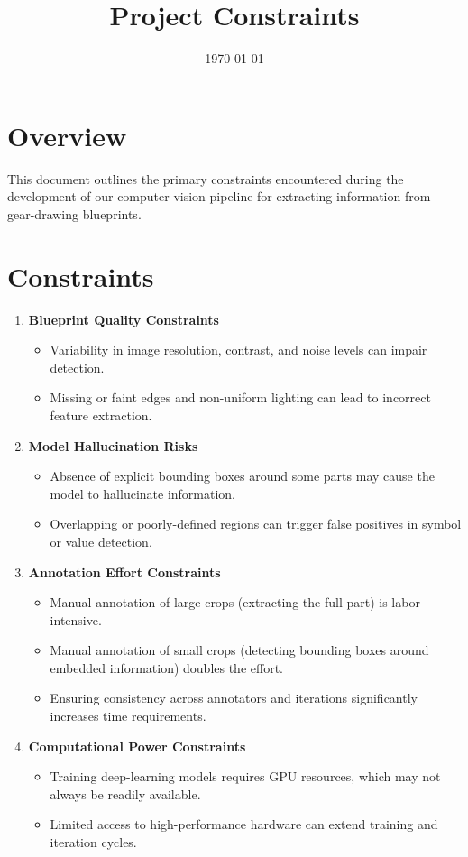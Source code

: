 \documentclass[a4paper,12pt]{article}
\title{Project Constraints}
\date{\today}
\begin{document}
\maketitle

\section*{Overview}
This document outlines the primary constraints encountered during the development
of our computer vision pipeline for extracting information from gear-drawing blueprints.

\section*{Constraints}
\begin{enumerate}[left=0pt]
\item \textbf{Blueprint Quality Constraints}
\begin{itemize}
\item Variability in image resolution, contrast, and noise levels can impair detection.
\item Missing or faint edges and non-uniform lighting can lead to incorrect feature extraction.
\end{itemize}

\item \textbf{Model Hallucination Risks}
\begin{itemize}
\item Absence of explicit bounding boxes around some parts may cause the model to hallucinate information.
\item Overlapping or poorly-defined regions can trigger false positives in symbol or value detection.
\end{itemize}

\item \textbf{Annotation Effort Constraints}
\begin{itemize}
\item Manual annotation of large crops (extracting the full part) is labor-intensive.
\item Manual annotation of small crops (detecting bounding boxes around embedded information) doubles the effort.
\item Ensuring consistency across annotators and iterations significantly increases time requirements.
\end{itemize}

\item \textbf{Computational Power Constraints}
\begin{itemize}
\item Training deep-learning models requires GPU resources, which may not always be readily available.
\item Limited access to high-performance hardware can extend training and iteration cycles.
\end{itemize}
\end{enumerate}
\end{document}
